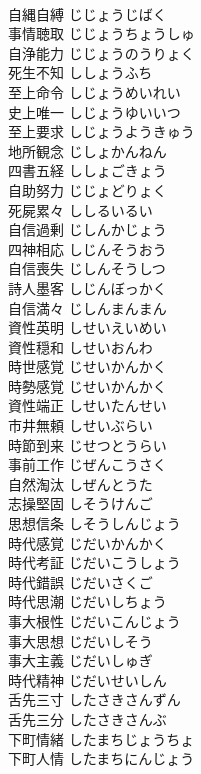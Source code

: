 \documentclass[8pt]{extreport}
\begin{document}
\begin{CJK}{UTF8}{min}
\\	自縄自縛	じじょうじばく	
\\	事情聴取	じじょうちょうしゅ	
\\	自浄能力	じじょうのうりょく	
\\	死生不知	ししょうふち	
\\	至上命令	しじょうめいれい	
\\	史上唯一	しじょうゆいいつ	
\\	至上要求	しじょうようきゅう	
\\	地所観念	じしょかんねん	
\\	四書五経	ししょごきょう	
\\	自助努力	じじょどりょく	
\\	死屍累々	ししるいるい	
\\	自信過剰	じしんかじょう	
\\	四神相応	しじんそうおう	
\\	自信喪失	じしんそうしつ	
\\	詩人墨客	しじんぼっかく	
\\	自信満々	じしんまんまん	
\\	資性英明	しせいえいめい	
\\	資性穏和	しせいおんわ	
\\	時世感覚	じせいかんかく	
\\	時勢感覚	じせいかんかく	
\\	資性端正	しせいたんせい	
\\	市井無頼	しせいぶらい	
\\	時節到来	じせつとうらい	
\\	事前工作	じぜんこうさく	
\\	自然淘汰	しぜんとうた	
\\	志操堅固	しそうけんご	
\\	思想信条	しそうしんじょう	
\\	時代感覚	じだいかんかく	
\\	時代考証	じだいこうしょう	
\\	時代錯誤	じだいさくご	
\\	時代思潮	じだいしちょう	
\\	事大根性	じだいこんじょう	
\\	事大思想	じだいしそう	
\\	事大主義	じだいしゅぎ	
\\	時代精神	じだいせいしん	
\\	舌先三寸	したさきさんずん	
\\	舌先三分	したさきさんぶ	
\\	下町情緒	したまちじょうちょ	
\\	下町人情	したまちにんじょう	

\end{CJK}
\end{document}

